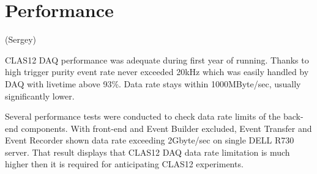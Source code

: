 \section{Performance}(Sergey)

CLAS12 DAQ performance was adequate during first year of running. Thanks to high trigger purity event rate never exceeded 20kHz which was easily handled by DAQ with livetime above 93\%. Data rate stays within 1000MByte/sec, usually significantly lower.

Several performance tests were conducted to check data rate limits of the back-end components. With front-end and Event Builder excluded, Event Transfer and Event Recorder shown data rate exceeding 2Gbyte/sec on single DELL R730 server. That result displays that CLAS12 DAQ data rate limitation is much higher then it is required for anticipating CLAS12 experiments.

